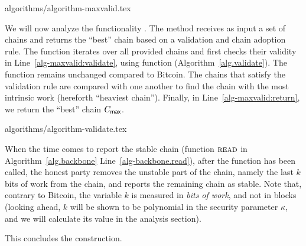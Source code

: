 {algorithms/algorithm-maxvalid.tex}

We will now analyze the functionality \maxvalid. The method receives as input
a set of chains and returns the ``best'' chain based on a validation and
chain adoption rule. The function iterates over all provided chains
and first checks their validity in Line~\ref{alg-maxvalid:validate}, using
function \validate (Algorithm~\ref{alg.validate}). The \validate function remains unchanged compared to
Bitcoin.
The chains that satisfy the validation rule
are compared with one another to find the chain
with the most intrinsic work (hereforth ``heaviest chain'').
Finally, in Line~\ref{alg-maxvalid:return}, we return the
``best'' chain $C_{\textsf{max}}$.

{algorithms/algorithm-validate.tex}

When the time comes to report the stable chain
(function $\textsc{read}$ in Algorithm~\ref{alg.backbone} Line~\ref{alg-backbone.read}),
after the function \execute has been called,
the honest party removes the unstable part of the chain, namely
the last $k$ bits of work from the chain, and reports
the remaining chain as stable. Note that, contrary to Bitcoin,
the variable $k$ is measured in \emph{bits of work}, and not in blocks
(looking ahead, $k$ will be shown to be polynomial in the
security parameter $\kappa$, and we will calculate its value
in the analysis section).

This concludes the \poem construction.

